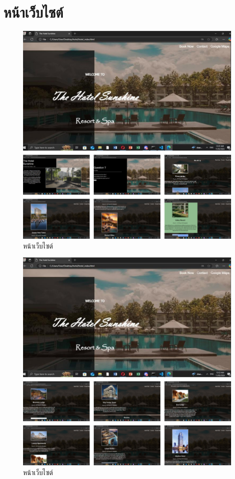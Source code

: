 \documentclass{report}
\begin{document}
\section{หน้าเว็บไซต์}
\pagebreak
\begin{figure}[h!]
\centering
\includegraphics[scale=0.50]{page1.png}
\caption{หน้าเว็บไซต์} 
\label{fig:graph16}
\end{figure} 

\begin{figure}[h!]
\centering
\includegraphics[scale=0.50]{page2.png}
\caption{หน้าเว็บไซต์} 
\label{fig:graph17}
\end{figure} 
\end{document}
